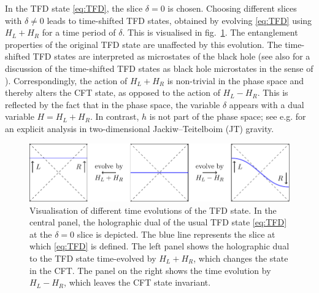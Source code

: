 \documentclass[a4paper,11pt]{article}
\newcommand{\1}{\mathds{1}}
\begin{document}
In the TFD state \eqref{eq:TFD}, the slice $\delta=0$ is chosen. Choosing different slices with $\delta\neq0$ leads to time-shifted TFD states, obtained by evolving \eqref{eq:TFD} using $H_L+H_R$ for a time period of $\delta$. This is visualised in fig.~\ref{fig:TimeEvolvedTFD}. The entanglement properties of the original TFD state are unaffected by this evolution. The time-shifted TFD states are interpreted as microstates of the black hole \cite{Papadodimas:2015jra} (see also \cite{Banerjee:2023liw} for a discussion of the time-shifted TFD states as black hole microstates in the sense of \cite{Balasubramanian:2022gmo,Balasubramanian:2022lnw}). Correspondingly, the action of $H_L+H_R$ is non-trivial in the phase space and thereby alters the CFT state, as opposed to the action of $H_L-H_R$. This is reflected by the fact that in the phase space, the variable $\delta$ appears with a dual variable $H=H_L+H_R$. In contrast, $h$ is not part of the phase space; see e.g. \cite{Harlow:2018tqv} for an explicit analysis in two-dimensional Jackiw--Teitelboim (JT) gravity.

\begin{figure}[t]
    \centering
    \includegraphics{TimeEvolvedTFD.pdf}
    \caption{Visualisation of different time evolutions of the TFD state. In the central panel, the holographic dual of the usual TFD state \eqref{eq:TFD} at the $\delta=0$ slice is depicted. The blue line represents the slice at which \eqref{eq:TFD} is defined. The left panel shows the holographic dual to the TFD state time-evolved by $H_L+H_R$, which changes the state in the CFT. The panel on the right shows the time evolution by $H_L-H_R$, which leaves the CFT state invariant.}
    \label{fig:TimeEvolvedTFD}
\end{figure}
\end{document}
